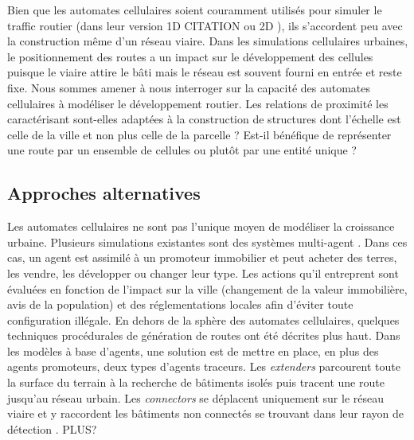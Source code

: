 \documentclass[10pt]{article}
\begin{document}
Bien que les automates cellulaires soient couramment utilisés pour
simuler le traffic routier (dans leur version 1D CITATION ou 2D
\cite{Queloz1996}), ils s'accordent peu avec la construction même d'un
réseau viaire. Dans les simulations cellulaires urbaines, le
positionnement des routes a un impact sur le développement des
cellules puisque le viaire attire le bâti mais le réseau est souvent
fourni en entrée et reste fixe. Nous sommes amener à nous interroger
sur la capacité des automates cellulaires à modéliser le développement
routier. Les relations de proximité les caractérisant sont-elles
adaptées à la construction de structures dont l'échelle est celle de
la ville et non plus celle de la parcelle ? Est-il bénéfique de
représenter une route par un ensemble de cellules ou plutôt par une
entité unique ?

\subsection{Approches alternatives}

Les automates cellulaires ne sont pas l'unique moyen de modéliser la
croissance urbaine. Plusieurs simulations existantes sont des systèmes
multi-agent \cite{Lechnera,Lechner2004}. Dans ces cas, un agent est
assimilé à un promoteur immobilier et peut acheter des terres, les
vendre, les développer ou changer leur type. Les actions qu'il
entreprent sont évaluées en fonction de l'impact sur la ville
(changement de la valeur immobilière, avis de la population) et des
réglementations locales afin d'éviter toute configuration illégale.
En dehors de la sphère des automates cellulaires, quelques techniques
procédurales de génération de routes ont été décrites plus haut. Dans
les modèles à base d'agents, une solution est de mettre en place, en
plus des agents promoteurs, deux types d'agents traceurs. Les
\textit{extenders} parcourent toute la surface du terrain à la
recherche de bâtiments isolés puis tracent une route jusqu'au réseau
urbain. Les \textit{connectors} se déplacent uniquement sur le réseau
viaire et y raccordent les bâtiments non connectés se trouvant dans
leur rayon de détection \cite{Lechnera}. PLUS?
\end{document}
